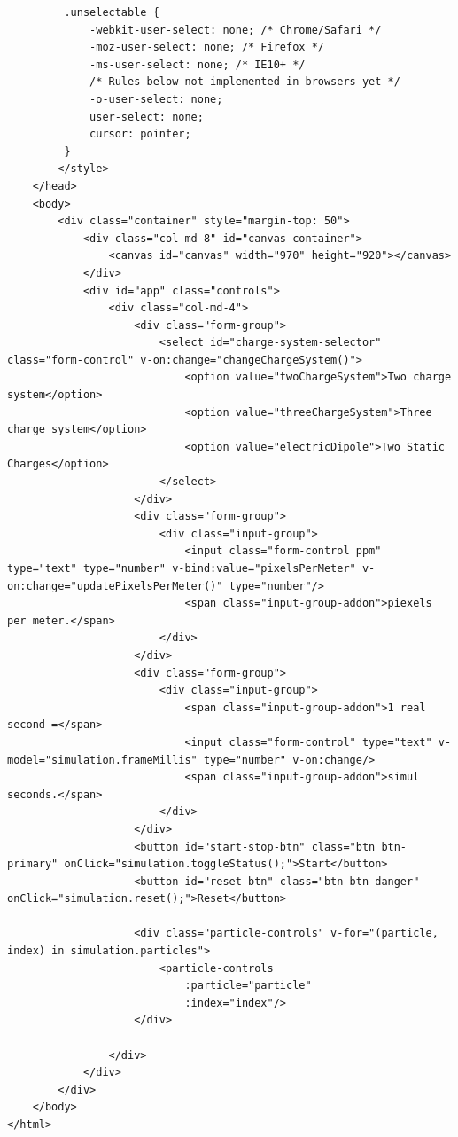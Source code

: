 \documentclass[11pt]{article}
\begin{document}
\begin{verbatim}
         .unselectable {
             -webkit-user-select: none; /* Chrome/Safari */        
             -moz-user-select: none; /* Firefox */
             -ms-user-select: none; /* IE10+ */
             /* Rules below not implemented in browsers yet */
             -o-user-select: none;
             user-select: none;
             cursor: pointer;
         }
        </style>
    </head>
    <body>
        <div class="container" style="margin-top: 50">
            <div class="col-md-8" id="canvas-container">
                <canvas id="canvas" width="970" height="920"></canvas>
            </div>
            <div id="app" class="controls">
                <div class="col-md-4">
                    <div class="form-group">
                        <select id="charge-system-selector" class="form-control" v-on:change="changeChargeSystem()">
                            <option value="twoChargeSystem">Two charge system</option>
                            <option value="threeChargeSystem">Three charge system</option>
                            <option value="electricDipole">Two Static Charges</option>
                        </select>
                    </div>
                    <div class="form-group">
                        <div class="input-group">
                            <input class="form-control ppm" type="text" type="number" v-bind:value="pixelsPerMeter" v-on:change="updatePixelsPerMeter()" type="number"/>
                            <span class="input-group-addon">piexels per meter.</span>
                        </div>
                    </div>
                    <div class="form-group">
                        <div class="input-group">
                            <span class="input-group-addon">1 real second =</span>
                            <input class="form-control" type="text" v-model="simulation.frameMillis" type="number" v-on:change/>
                            <span class="input-group-addon">simul seconds.</span>
                        </div>
                    </div>
                    <button id="start-stop-btn" class="btn btn-primary" onClick="simulation.toggleStatus();">Start</button>
                    <button id="reset-btn" class="btn btn-danger" onClick="simulation.reset();">Reset</button>

                    <div class="particle-controls" v-for="(particle, index) in simulation.particles">
                        <particle-controls
                            :particle="particle"
                            :index="index"/>
                    </div>

                </div>
            </div>
        </div>
    </body>
</html>
\end{verbatim}
\end{document}
